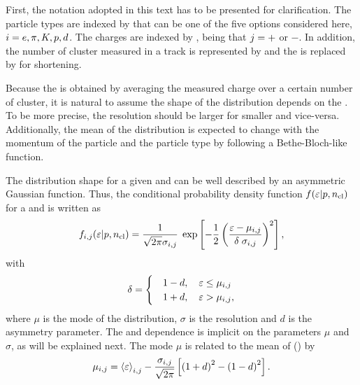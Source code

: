 First, the notation adopted in this text has to be presented
for clarification. The particle types are indexed by
\ipart that can be one of the five options
considered here, $i=e, \pi, K, p, d$. The charges are indexed by
\ich, being that $j = +$ or $-$. In addition, the number of
cluster measured in a track is represented by \ncl and the \dedx
is replaced by \eps for shortening.

Because the \dedx is obtained by averaging the measured charge
over a certain number of cluster, it is natural to assume 
the shape of the \eps distribution depends on the \ncl.
To be more precise, the \eps resolution should be 
larger for smaller \ncl and vice-versa. 
Additionally, the mean of the distribution is expected  
to change with the momentum of the particle \pp and the particle type
by following a Bethe-Bloch-like function.

The \eps distribution shape for a given \ncl and \pp
can be well described by an asymmetric Gaussian function.
Thus, the conditional probability density function $f(\mbox{$\varepsilon$}|p,\mbox{$n_{\text{cl}}$})$ for a 
\ipart and \ich is written as
\begin{equation}
  f_{i,j}(\mbox{$\varepsilon$}|p,\mbox{$n_{\text{cl}}$}) = \frac{1}{\sqrt{2\pi}\sigma_{i,j}} \;
  \exp\left[-\frac{1}{2}\left(\frac{\mbox{$\varepsilon$}-\mu_{i,j}}{\delta \; \sigma_{i,j}}\right)^2\right],
  \label{eq:hadron:dedx:model:pdf}
\end{equation}
with
\begin{equation}
  \delta =
  \begin{cases}
    & 1-d, \ \ \ \mbox{$\varepsilon$} \le \mu_{i,j} \\
    & 1+d, \ \ \ \mbox{$\varepsilon$} > \mu_{i,j}, \\
  \end{cases}
  \label{eq:hadron:dedx:model:asymm}
\end{equation}
where $\mu$ is the mode of the distribution, $\sigma$ is the resolution
and $d$ is the asymmetry parameter. The \pp and \ncl dependence is implicit
on the parameters $\mu$ and $\sigma$, as will be explained next.
The mode $\mu$ is related to the mean of \eps (\meaneps) by
\begin{equation}
  \mu_{i,j} = \mbox{$\langle\varepsilon\rangle$}_{i,j} - \frac{\sigma_{i,j}}{\sqrt{2\pi}}
  \left[\left(1+d\right)^2 - \left(1-d\right)^2 \right].
  \label{eq:hadron:dedx:model:mu}
\end{equation}

